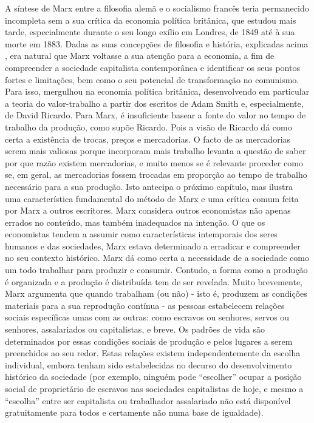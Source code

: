 A síntese de Marx entre a filosofia alemã e o socialismo francês teria permanecido incompleta sem a sua crítica da economia política britânica, que estudou mais tarde, especialmente durante o seu longo exílio em Londres, de 1849 até à sua morte em 1883. Dadas as suas concepções de filosofia e história, explicadas acima , era natural que Marx voltasse a sua atenção para a economia, a fim de compreender a sociedade capitalista contemporânea e identificar os seus pontos fortes e limitações, bem como o seu potencial de transformação no comunismo. Para isso, mergulhou na economia política britânica, desenvolvendo em particular a teoria do valor-trabalho a partir dos escritos de Adam Smith e, especialmente, de David Ricardo. Para Marx, é insuficiente basear a fonte do valor no tempo de trabalho da produção, como supõe Ricardo. Pois a visão de Ricardo dá como certa a existência de trocas, preços e mercadorias. O facto de as mercadorias serem mais valiosas porque incorporam mais trabalho levanta a questão de saber por que razão existem mercadorias, e muito menos se é relevante proceder como se, em geral, as mercadorias fossem trocadas em proporção ao tempo de trabalho necessário para a sua produção. Isto antecipa o próximo capítulo, mas ilustra uma característica fundamental do método de Marx e uma crítica comum feita por Marx a outros escritores. Marx considera outros economistas não apenas errados no conteúdo, mas também inadequados na intenção. O que os economistas tendem a assumir como características intemporais dos seres humanos e das sociedades, Marx estava determinado a erradicar e compreender no seu contexto histórico. Marx dá como certa a necessidade de a sociedade como um todo trabalhar para produzir e consumir. Contudo, a forma como a produção é organizada e a produção é distribuída tem de ser revelada. Muito brevemente, Marx argumenta que quando trabalham (ou não) - isto é, produzem as condições materiais para a sua reprodução contínua - as pessoas estabelecem relações sociais específicas umas com as outras: como escravos ou senhores, servos ou senhores, assalariados ou capitalistas, e breve. Os padrões de vida são determinados por essas condições sociais de produção e pelos lugares a serem preenchidos ao seu redor. Estas relações existem independentemente da escolha individual, embora tenham sido estabelecidas no decurso do desenvolvimento histórico da sociedade (por exemplo, ninguém pode “escolher” ocupar a posição social de proprietário de escravos nas sociedades capitalistas de hoje, e mesmo a “escolha” entre ser capitalista ou trabalhador assalariado não está disponível gratuitamente para todos e certamente não numa base de igualdade).
